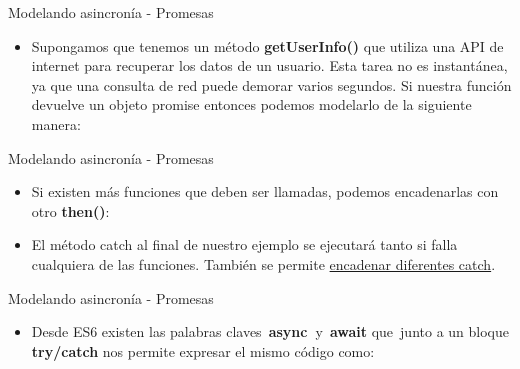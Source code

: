 \documentclass[aspectratio=43,10pt,t]{beamer}
\begin{document}
\begin{frame}{Modelando asincronía - Promesas}\relax
\begingroup
{}
\begin{itemize}
  \item Supongamos que tenemos un método \textbf{getUserInfo()} que utiliza una API de internet para recuperar los datos de un usuario. Esta tarea no es instantánea, ya que una consulta de red puede demorar varios segundos. Si nuestra función devuelve un objeto promise entonces podemos modelarlo de la siguiente manera:
\end{itemize}
\endgroup
{}
\end{frame}

\begin{frame}{Modelando asincronía - Promesas}\relax
\begingroup
{}
\begin{itemize}
  \item Si existen más funciones que deben ser llamadas, podemos encadenarlas con otro \textbf{then()}:
  \item El método catch al final de nuestro ejemplo se ejecutará tanto si falla cualquiera de las funciones. También se permite \uline{encadenar diferentes catch}.
\end{itemize}
\endgroup
{}
\end{frame}

\begin{frame}{Modelando asincronía - Promesas}\relax
\begingroup
{}
\begin{itemize}
  \item Desde ES6 existen las palabras claves~\textbf{async~}y~\textbf{await} que~junto a un bloque \textbf{try/catch} nos permite expresar el mismo código como:
\end{itemize}
\endgroup
{}
\end{frame}
\end{document}
